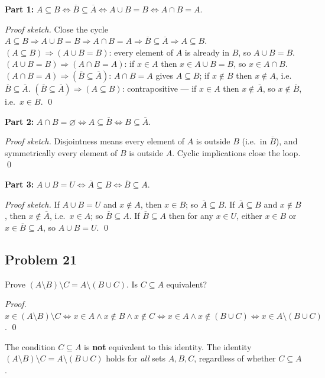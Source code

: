 \textbf{Part 1:} $A \subseteq B \iff \overline{B} \subseteq \overline{A} \iff A \cup B = B \iff A \cap B = A$.

\textit{Proof sketch.} Close the cycle $A \subseteq B \Rightarrow A \cup B = B \Rightarrow A \cap B = A \Rightarrow \overline{B} \subseteq \overline{A} \Rightarrow A \subseteq B$.
$(A \subseteq B) \Rightarrow (A \cup B = B)$: every element of $A$ is already in $B$, so $A \cup B = B$.
$(A \cup B = B) \Rightarrow (A \cap B = A)$: if $x \in A$ then $x \in A \cup B = B$, so $x \in A \cap B$.
$(A \cap B = A) \Rightarrow (\overline{B} \subseteq \overline{A})$: $A \cap B = A$ gives $A \subseteq B$; if $x \notin B$ then $x \notin A$, i.e.\ $\overline{B} \subseteq \overline{A}$.
$(\overline{B} \subseteq \overline{A}) \Rightarrow (A \subseteq B)$: contrapositive --- if $x \in A$ then $x \notin \overline{A}$, so $x \notin \overline{B}$, i.e.\ $x \in B$. \qed

\textbf{Part 2:} $A \cap B = \varnothing \iff A \subseteq \overline{B} \iff B \subseteq \overline{A}$.

\textit{Proof sketch.} Disjointness means every element of $A$ is outside $B$ (i.e.\ in $\overline{B}$), and symmetrically every element of $B$ is outside $A$. Cyclic implications close the loop. \qed

\textbf{Part 3:} $A \cup B = U \iff \overline{A} \subseteq B \iff \overline{B} \subseteq A$.

\textit{Proof sketch.} If $A \cup B = U$ and $x \notin A$, then $x \in B$; so $\overline{A} \subseteq B$. If $\overline{A} \subseteq B$ and $x \notin B$, then $x \notin \overline{A}$, i.e.\ $x \in A$; so $\overline{B} \subseteq A$. If $\overline{B} \subseteq A$ then for any $x \in U$, either $x \in B$ or $x \in \overline{B} \subseteq A$, so $A \cup B = U$. \qed

\subsection*{Problem 21}
Prove $(A \setminus B) \setminus C = A \setminus (B \cup C)$. Is $C \subseteq A$ equivalent?

\textit{Proof.} $x \in (A \setminus B) \setminus C \iff x \in A \land x \notin B \land x \notin C \iff x \in A \land x \notin (B \cup C) \iff x \in A \setminus (B \cup C)$. \qed

The condition $C \subseteq A$ is \textbf{not} equivalent to this identity. The identity $(A \setminus B) \setminus C = A \setminus (B \cup C)$ holds for \emph{all} sets $A, B, C$, regardless of whether $C \subseteq A$.

